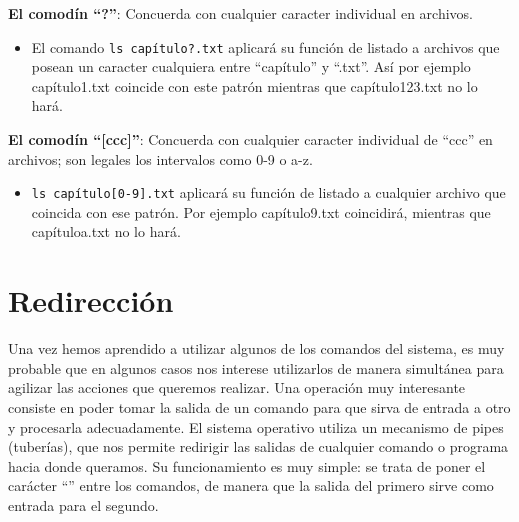 \documentclass[12pt]{article}
\begin{document}
\textbf{El comodín ``?''}:
Concuerda con cualquier caracter individual en archivos. 
\begin{itemize}
\item El comando \texttt{ls capítulo?.txt} aplicará su función de listado a archivos que posean un caracter
cualquiera entre ``capítulo'' y ``.txt''. Así por ejemplo capítulo1.txt coincide con este patrón mientras que 
capítulo123.txt no lo hará. 
\end{itemize} 

\textbf{El comodín ``[ccc]''}:
Concuerda con cualquier caracter individual de ``ccc'' en archivos; son legales los intervalos como 
0-9 o a-z. 
\begin{itemize}
\item \texttt{ls capítulo[0-9].txt} aplicará su función de listado a cualquier archivo que coincida 
con ese patrón. Por ejemplo capítulo9.txt coincidirá, mientras que capítuloa.txt no lo hará. 
\end{itemize} 




\section{Redirección}

Una vez hemos aprendido a utilizar algunos de los comandos del sistema, es muy probable que en 
algunos casos nos interese utilizarlos de manera simultánea para agilizar las 
acciones que queremos realizar. Una operación muy interesante consiste en poder 
tomar la salida de un comando para que sirva de entrada a otro y procesarla adecuadamente. 
El sistema operativo utiliza un mecanismo de pipes (tuberías), que nos permite redirigir las salidas 
de cualquier comando o programa hacia donde queramos. Su funcionamiento es muy simple: se trata de poner el 
carácter ``\textbar'' entre los comandos, de manera que la salida del primero sirve como
 entrada para el segundo.
\end{document}

